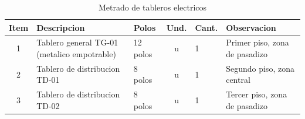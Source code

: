 \begin{table}[H]
\centering
\small
\caption{Metrado de tableros electricos}
\label{tab:metrado-tableros}
\begin{tabularx}{\textwidth}{c L{4.5cm} L{1.8cm} c L{1.8cm} Y}
\toprule
\textbf{Item} & \textbf{Descripcion} & \textbf{Polos} & \textbf{Und.} & \textbf{Cant.} & \textbf{Observacion} \\
 & Tablero general TG-01 (metalico empotrable) & 12 polos & u & 1 & Primer piso, zona de pasadizo \\
2 & Tablero de distribucion TD-01 & 8 polos & u & 1 & Segundo piso, zona central \\
3 & Tablero de distribucion TD-02 & 8 polos & u & 1 & Tercer piso, zona de pasadizo \\
\bottomrule
\end{tabularx}
\end{table}

